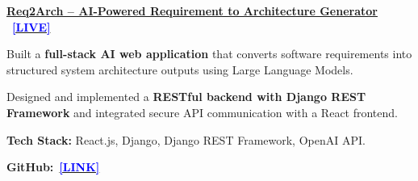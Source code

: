 \begin{onecolentry}
\textbf{\underline{Req2Arch – AI-Powered Requirement to Architecture Generator}} ~\href{https://req2-arch.vercel.app/}{\textbf{\textcolor{blue}{[LIVE]}}}
\end{onecolentry}
\vspace{0.1cm}
\begin{onecolentry}
    \begin{highlights}
        \item Built a \textbf{full-stack AI web application} that converts software requirements into structured system architecture outputs using Large Language Models. 
        \item Designed and implemented a \textbf{RESTful backend with Django REST Framework} and integrated secure API communication with a React frontend.
        \item \textbf{Tech Stack:} React.js, Django, Django REST Framework, OpenAI API.
        \item \textbf{GitHub:}~\href{https://github.com/SkJishan04/Req2Arch}{\textbf{\textcolor{blue}{[LINK]}}}
    \end{highlights}
\end{onecolentry}